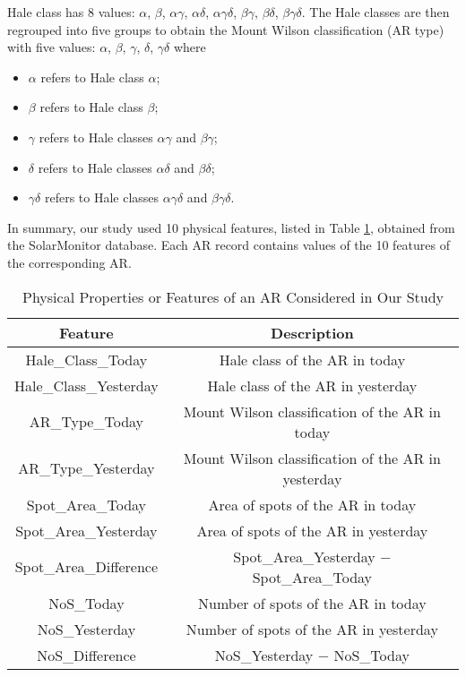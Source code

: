 \documentclass[draft]{agujournal2019}
\begin{document}
Hale class has 8 values:
$\alpha$,
$\beta$,
$\alpha$$\gamma$,
$\alpha$$\delta$,
$\alpha$$\gamma$$\delta$,
$\beta$$\gamma$,
$\beta$$\delta$,
$\beta$$\gamma$$\delta$.
The Hale classes are then regrouped into five groups to obtain the Mount Wilson classification (AR type) with five values:
$\alpha$,
$\beta$,
$\gamma$,
$\delta$,
$\gamma$$\delta$
where
\begin{itemize}
\item 
$\alpha$ refers to Hale class $\alpha$;
\item 
$\beta$ refers to Hale class $\beta$; 
\item 
$\gamma$ refers to Hale classes $\alpha$$\gamma$ and $\beta$$\gamma$;
\item 
$\delta$ refers to Hale classes $\alpha$$\delta$ and $\beta$$\delta$;
\item 
$\gamma$$\delta$ refers to Hale classes $\alpha$$\gamma$$\delta$ and $\beta$$\gamma$$\delta$.
\end{itemize}

In summary, our study used 10 physical features, 
listed in Table \ref{tab:10features}, obtained from the SolarMonitor database.
Each AR record contains values of the 10 features
of the corresponding AR.

\begin{table}[h]
    \centering
    \begin{tabular}{|c|c|}
        \hline
        \textbf{Feature} & \textbf{Description} \\ \hline
        Hale\_Class\_Today & Hale class of the AR in today \\ \hline
        Hale\_Class\_Yesterday & Hale class of the AR 
        in yesterday\\ \hline
        AR\_Type\_Today & Mount Wilson classification of 
        the AR in today\\ \hline
        AR\_Type\_Yesterday & Mount Wilson classification of the AR in yesterday \\ \hline
        Spot\_Area\_Today & Area of spots of the AR in today \\ \hline
        Spot\_Area\_Yesterday & Area of spots of the AR in yesterday  \\ \hline
        Spot\_Area\_Difference  &  Spot\_Area\_Yesterday $-$
        Spot\_Area\_Today\\ \hline
        NoS\_Today & Number of spots of the AR in today \\ \hline
        NoS\_Yesterday & Number of spots of the AR in yesterday \\ \hline
        NoS\_Difference &  NoS\_Yesterday
        $-$ NoS\_Today \\ \hline 
    \end{tabular}
    \vspace*{+0.5cm}
    \caption{Physical Properties or Features of an AR Considered in Our Study}
    \label{tab:10features}
\end{table}
\end{document}
